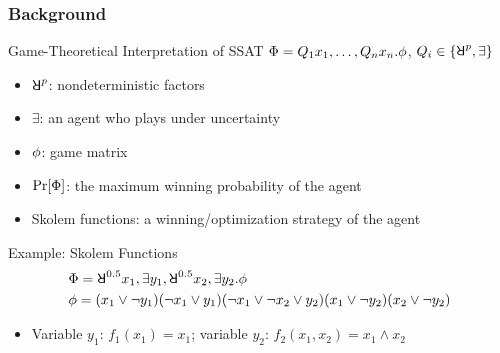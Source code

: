 \begin{frame}
    \frametitle{Background}
    \begin{block}{Game-Theoretical Interpretation of SSAT}
        $\Phi=Q_1 x_1,\ldots,Q_n x_n.\phi$, $Q_i \in \{\random{p},\exists\}$
        \pause
        \begin{itemize}
            \item $\random{p}$: nondeterministic factors
                  \pause
            \item $\exists$: an agent who plays under uncertainty
                  \pause
            \item $\phi$: game matrix
                  \pause
            \item $\Pr[\Phi]$: the maximum winning probability of the agent
                  \pause
            \item \alert{Skolem functions}: a winning/optimization strategy of the agent
        \end{itemize}
    \end{block}\pause
    \begin{block}{Example: Skolem Functions}
        \abovedisplayskip=0pt
        \belowdisplayskip=0pt
        \begin{align*}
             & \Qf=\random{0.5} x_1, \exists y_1, \random{0.5} x_2, \exists y_2. \pf \\
             & \pf=(x_1 \lor \lnot y_1)
            (\lnot x_1 \lor y_1)
            (\lnot x_1 \lor \lnot x_2 \lor y_2)
            (x_1 \lor \lnot y_2)
            (x_2 \lor \lnot y_2)
        \end{align*}
        \pause
        \begin{itemize}
            \item Variable $y_1$: $f_1(x_1)=x_1$; variable $y_2$: $f_2(x_1,x_2)=x_1 \land x_2$
        \end{itemize}
    \end{block}
\end{frame}